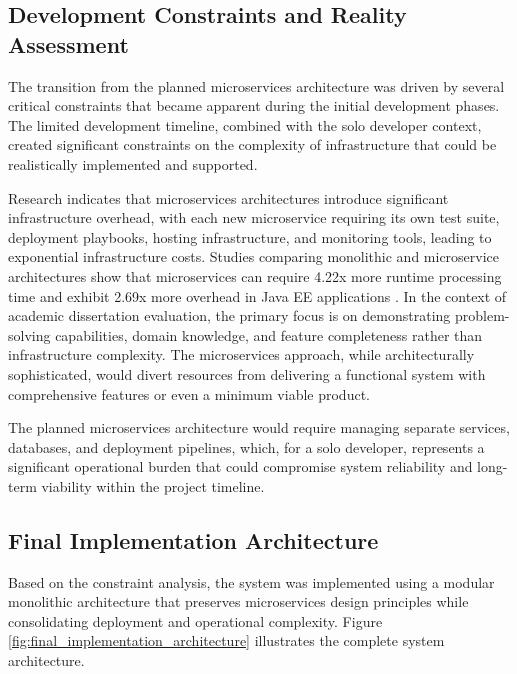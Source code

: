 \subsection{Development Constraints and Reality Assessment}

The transition from the planned microservices architecture was driven by several critical constraints that became apparent during the initial development phases. The limited development timeline, combined with the solo developer context, created significant constraints on the complexity of infrastructure that could be realistically implemented and supported.

Research indicates that microservices architectures introduce significant infrastructure overhead, with each new microservice requiring its own test suite, deployment playbooks, hosting infrastructure, and monitoring tools, leading to exponential infrastructure costs. Studies comparing monolithic and microservice architectures show that microservices can require 4.22x more runtime processing time and exhibit 2.69x more overhead in Java EE applications \cite{MonolithicVsMicroservices2020}. In the context of academic dissertation evaluation, the primary focus is on demonstrating problem-solving capabilities, domain knowledge, and feature completeness rather than infrastructure complexity. The microservices approach, while architecturally sophisticated, would divert resources from delivering a functional system with comprehensive features or even a minimum viable product.

The planned microservices architecture would require managing separate services, databases, and deployment pipelines, which, for a solo developer, represents a significant operational burden that could compromise system reliability and long-term viability within the project timeline.

\subsection{Final Implementation Architecture}

Based on the constraint analysis, the system was implemented using a modular monolithic architecture that preserves microservices design principles while consolidating deployment and operational complexity. Figure \ref{fig:final_implementation_architecture} illustrates the complete system architecture.

